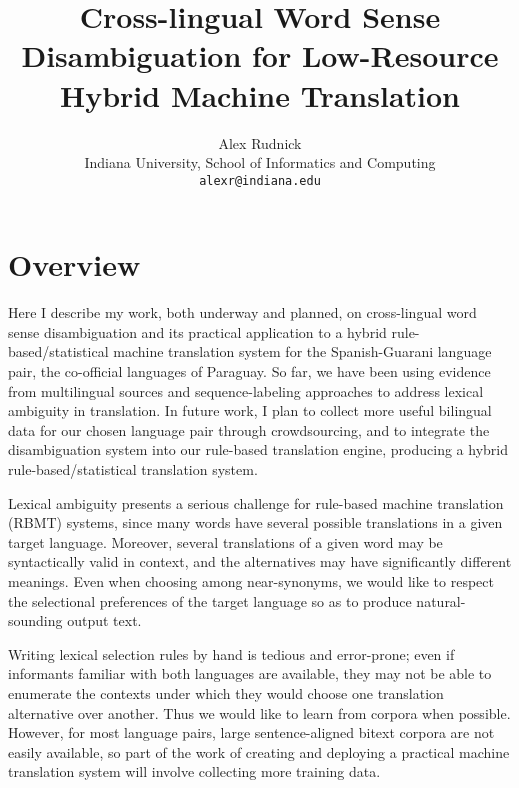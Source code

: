 \documentclass{article}
\title{Cross-lingual Word Sense Disambiguation for Low-Resource Hybrid Machine
Translation}
\author{Alex Rudnick \\
	    Indiana University, School of Informatics and Computing \\
	    {\tt alexr@indiana.edu}}
\date{}
\begin{document}
\maketitle

\section{Overview}
Here I describe my work, both underway and planned, on cross-lingual word sense
disambiguation and its practical application to a hybrid rule-based/statistical
machine translation system for the Spanish-Guarani language pair, the
co-official languages of Paraguay.  So far, we have been using evidence from
multilingual sources and sequence-labeling approaches to address lexical
ambiguity in translation. In future work, I plan to collect more useful
bilingual data for our chosen language pair through crowdsourcing, and to
integrate the disambiguation system into our rule-based translation engine,
producing a hybrid rule-based/statistical translation system.

Lexical ambiguity presents a serious challenge for rule-based machine
translation (RBMT) systems, since many words have several possible translations
in a given target language. Moreover, several translations of a given word may
be syntactically valid in context, and the alternatives may have significantly
different meanings. Even when choosing among near-synonyms, we would like to
respect the selectional preferences of the target language so as to produce
natural-sounding output text.

Writing lexical selection rules by hand is tedious and error-prone; even if
informants familiar with both languages are available, they may not be able to
enumerate the contexts under which they would choose one translation
alternative over another. Thus we would like to learn from corpora when
possible. However, for most language pairs, large sentence-aligned bitext
corpora are not easily available, so part of the work of creating and deploying
a practical machine translation system will involve collecting more training
data.
\end{document}
